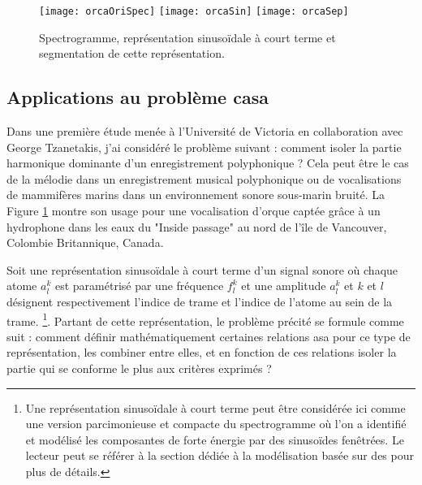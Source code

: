 \begin{figure}[t]
  \texttt{[image: orcaOriSpec]}
  \texttt{[image: orcaSin]}
  \texttt{[image: orcaSep]}
  \label{fig:orca}
  \caption{Spectrogramme, représentation sinusoïdale à court terme et segmentation de cette représentation.}
\end{figure}

\subsection{Applications au problème casa}


Dans une première étude menée à l'Université de Victoria en collaboration avec George Tzanetakis, j'ai considéré le problème suivant : comment isoler la partie harmonique dominante d'un enregistrement polyphonique ? Cela peut être le cas de la mélodie dans un enregistrement musical polyphonique ou de vocalisations de mammifères marins dans un environnement sonore sous-marin bruité. La Figure \ref{fig:orca} montre son usage pour une vocalisation d'orque captée grâce à un hydrophone dans les eaux du "Inside passage" au nord de l'île de Vancouver, Colombie Britannique, Canada.

Soit une représentation sinusoïdale à court terme d'un signal sonore où chaque atome $a_l^k$ est paramétrisé par une fréquence $f_l^k$ et une amplitude $a_l^k$ et $k$ et $l$ désignent respectivement l'indice de trame et l'indice de l'atome au sein de la trame. \footnote{Une représentation sinusoïdale à court terme peut être considérée ici comme une version parcimonieuse et compacte du spectrogramme où l'on a identifié et modélisé les composantes de forte énergie par des sinusoïdes fenêtrées. Le lecteur peut se référer à la section dédiée à la modélisation basée sur des   pour plus de détails.}. Partant de cette représentation, le problème précité se formule comme suit : comment définir mathématiquement certaines relations asa pour ce type de représentation, les combiner entre elles, et en fonction de ces relations isoler la partie qui se conforme le plus aux critères exprimés ?

